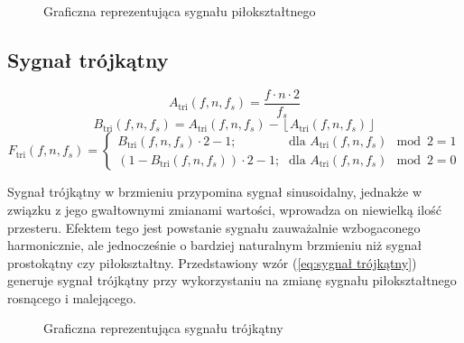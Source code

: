 \begin{figure}[H]
    \centering
    \scalebox{1.0}{}
    \caption{Graficzna reprezentująca sygnału piłokształtnego}
    \label{fig:Graficzna reprezentująca sygnału piłokształtnego}
\end{figure}


\subsection{Sygnał trójkątny}
\newcommand{\Ftriangle}{F_{\text{tri}}}
\newcommand{\Atriangle}{A_{\text{tri}}}
\newcommand{\Btriangle}{B_{\text{tri}}}

\begin{equation}
    \Atriangle(f, n, f_s) = \frac{f \cdot n \cdot 2}{f_s}
    \label{eq:sygnał trójkątny a}
\end{equation}
\begin{equation}
    \Btriangle(f, n, f_s) = \Atriangle(f, n, f_s) - \left\lfloor \Atriangle(f, n, f_s) \right\rfloor
    \label{eq:sygnał trójkątny b}
\end{equation}
\begin{equation}
    \Ftriangle(f, n, f_s) = \left\{
    \begin{array}{ll}
        \Btriangle(f, n, f_s) \cdot 2 - 1 \text{;} & \text{dla } \Atriangle(f, n, f_s) \mod 2 = 1 \\
        (1 - \Btriangle(f, n, f_s)) \cdot 2 - 1 \text{;} & \text{dla } \Atriangle(f, n, f_s) \mod 2 = 0
    \end{array}
    \right.
    \label{eq:sygnał trójkątny}
\end{equation}

\vspace{10pt}Sygnał trójkątny w brzmieniu przypomina sygnał sinusoidalny, jednakże w związku z jego gwałtownymi zmianami wartości, wprowadza on niewielką ilość przesteru. Efektem tego jest powstanie sygnału zauważalnie wzbogaconego harmonicznie, ale jednocześnie o bardziej naturalnym brzmieniu niż sygnał prostokątny czy piłokształtny. Przedstawiony wzór (\ref{eq:sygnał trójkątny}) generuje sygnał trójkątny przy wykorzystaniu na zmianę sygnału piłokształtnego rosnącego i malejącego.

\begin{figure}[H]
    \centering
    \scalebox{1.0}{}
    \caption{Graficzna reprezentująca sygnału trójkątny}
    \label{fig:Graficzna reprezentująca sygnału trójkątny}
\end{figure}



